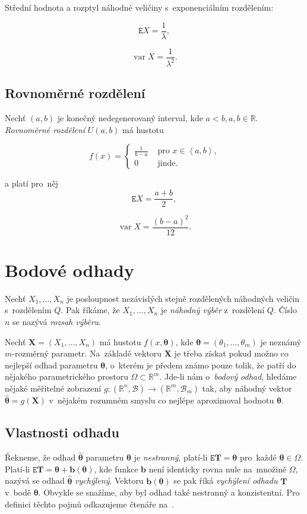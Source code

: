 \documentclass[thesis=B,czech]{FITthesis}[2012/06/26]
\DeclareMathOperator{\var}{var}						%
\begin{document}
Střední hodnota a rozptyl náhodné veličiny s~exponenciálním rozdělením: 

$$\mathtt{E}X=\frac{1}{\lambda},$$

$$\var X = \frac{1}{\lambda^2}.$$



\subsection{Rovnoměrné rozdělení}
Nechť $(a,b)$ je konečný nedegenerovaný interval, kde $a<b, a,b\in\mathbb{R}$. \textit{Rovnoměrné rozdělení} $U(a,b)$ má hustotu

$$
f(x) = \left\{ \begin{array}{rl}
\frac{1}{b-a} &\mbox{ pro~$x\in\left \langle a,b  \right \rangle$,} \\
0 &\mbox{ jinde.}
\end{array} \right.
$$

a platí pro~něj
$$\mathtt{E}X=\frac{a+b}{2},$$

$$\var X=\frac{(b-a)^2}{12}.$$


\section{Bodové odhady}


Nechť $X_{1},...,X_{n}$ je posloupnost nezávislých stejně rozdělených náhodných veličin s~rozdělením $Q$. Pak říkáme, že $X_{1},...,X_{n}$ je \textit{náhodný výběr} z~rozdělení $Q$. Číslo $n$ se nazývá \textit{rozsah výběru}. 

Nechť $\mathbf{X}={(X_{1},\dotsc,X_{n})}$ má hustotu $f(x,\boldsymbol{\theta})$, kde $\boldsymbol{\theta} = (\theta_1,\dotsc,\theta_m)$ je neznámý $m$-rozměrný parametr. Na~základě vektoru $\mathbf{X}$ je třeba získat pokud možno co nejlepší odhad parametru $\boldsymbol{\theta}$, o~kterém je předem známo pouze tolik, že patří do nějakého parametrického prostoru $\Omega \subset \mathbb{R}^{m}$. Jde-li nám o~\textit{bodový odhad}, hledáme nějaké měřitelné zobrazení $g:(\mathbb{R}^{n},\mathcal{B})\rightarrow (\mathbb{R}^{m},\mathcal{B}_{m})$ tak, aby náhodný vektor $\hat{\boldsymbol{\theta}} = g(\mathbf{X})$ v~nějakém rozumném smyslu co nejlépe aproximoval hodnotu $\boldsymbol{\theta}$.

\subsection{Vlastnosti odhadu} 
Řekneme, že odhad $\hat{\boldsymbol{\theta}}$ parametru $\boldsymbol{\theta}$ je \textit{nestranný}, platí-li $\mathtt{E}\mathbf{T}=\boldsymbol{\theta}$ pro~každé $\boldsymbol{\theta}\in\Omega$. Platí-li $\mathtt{E}\mathbf{T}=\boldsymbol{\theta} + \mathbf{b}(\boldsymbol{\theta})$, kde funkce $\mathbf{b}$ není identicky rovna nule na~množině $\Omega$, nazývá se odhad $\hat{\boldsymbol{\theta}}$ \textit{vychýlený}. Vektoru $\mathbf{b}(\boldsymbol{\theta})$ se pak říká \textit{vychýlení odhadu} $\mathbf{T}$ v~bodě $\boldsymbol{\theta}$. 
Obvykle se snažíme, aby byl odhad také nestranný a konzistentní. Pro definici těchto pojmů odkazujeme čtenáře na~\cite[p.101-102]{Anděl}. 
\end{document}
